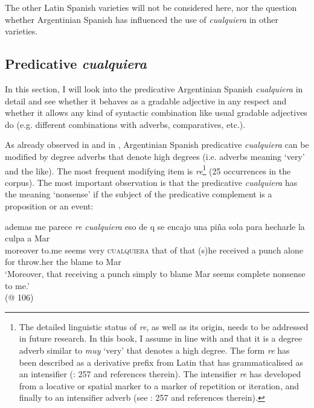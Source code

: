 The other Latin Spanish varieties will not be considered here, nor the question whether Argentinian Spanish has influenced the use of \textit{cualquiera} in other varieties.

\subsection{{Predicative} {\textit{cualquiera}}} \label{sec:4.3.2}

In this section, I will look into the predicative Argentinian Spanish \textit{cualquiera} in detail and see whether it behaves as a gradable adjective in any respect and whether it allows any kind of syntactic combination like usual gradable adjectives do (e.g. different combinations with adverbs, comparatives, etc.).

As already observed in  and in , Argentinian Spanish predicative \textit{cualquiera} can be modified by degree adverbs that denote high degrees (i.e. adverbs meaning ‘very’ and the like). The most frequent modifying item is \textit{re}\footnote{{The detailed linguistic status of} {\textit{re}}{, as well as its origin, needs to be addressed in future research. In this book, I assume in line with \citet{Rizzosalierno2013} and \citet{KanwitTerán2020} that it is a degree adverb similar to} {\textit{muy}} {‘very’ that denotes a high degree. The form} {\textit{re}} {has been described as a derivative prefix from Latin that has grammaticalised as an intensifier (\citealt{KanwitTerán2020}: 257 and references therein). The intensifier} {\textit{re}} {has developed from a locative or spatial marker to a marker of repetition or iteration, and finally to an intensifier adverb (see \citealt{KanwitTerán2020}: 257 and references therein).}} (25 occurrences in the corpus). The most important observation is that the predicative \textit{cualquiera} has the meaning ‘nonsense’ if the subject of the predicative complement is a proposition or an event:

\ea \label{ex:key:193} %
    \gll ademas me parece \textit{re} \textit{cualquiera} eso de q se encajo una piña sola para hecharle la culpa a Mar\\
    moreover to.me seems very \textsc{cualquiera} that of that (s)he received a punch alone for throw.her the blame to Mar\\
    \glt ‘Moreover, that receiving a punch simply to blame Mar seems complete nonsense to me.’\\
    (@ 106)
\z

